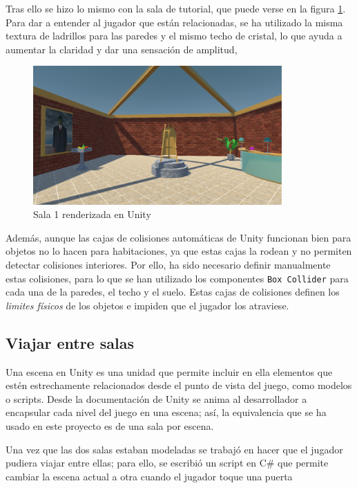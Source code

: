 Tras ello se hizo lo mismo con la sala de tutorial, que puede verse en la figura \ref{fig:unity-sala-1}. Para dar a entender al jugador que están relacionadas, se ha utilizado la misma textura de ladrillos para las paredes y el mismo techo de cristal, lo que ayuda a aumentar la claridad y dar una sensación de amplitud,

\begin{figure}[!h]
\begin{center}
\includegraphics[width=0.85\textwidth]{imagenes/7/salas-unity/unity-sala-1.png}
\caption{Sala 1 renderizada en Unity}
\label{fig:unity-sala-1}
\end{center}
\end{figure}

Además, aunque las cajas de colisiones automáticas de Unity funcionan bien para objetos no lo hacen para habitaciones, ya que estas cajas la rodean y no permiten detectar colisiones interiores. Por ello, ha sido necesario definir manualmente estas colisiones, para lo que se han utilizado los componentes \texttt{Box Collider} para cada una de la paredes, el techo y el suelo. Estas cajas de colisiones definen los \textit{limites físicos} de los objetos e impiden que el jugador los atraviese.

\subsection{Viajar entre salas}

Una escena en Unity es una unidad que permite incluir en ella elementos que estén estrechamente relacionados desde el punto de vista del juego, como modelos o scripts. Desde la documentación de Unity se anima al desarrollador a encapsular cada nivel del juego en una escena; así, la equivalencia que se ha usado en este proyecto es de una sala por escena.

Una vez que las dos salas estaban modeladas se trabajó en hacer que el jugador pudiera viajar entre ellas; para ello, se escribió un script en C\# que permite cambiar la escena actual a otra cuando el jugador toque una puerta 

